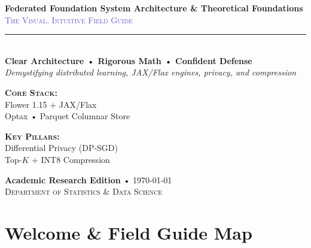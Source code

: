 \documentclass[11pt,a4paper,titlepage]{report}
\begin{document}
\begin{titlepage}
    \centering
    \vspace*{1.2cm}
    {\Huge \textbf{\textcolor{DeepNavy}{Federated Foundation System Architecture \& Theoretical Foundations}}}\\[0.5cm]
    {\Large \textsc{\textcolor{SlateBlue}{The Visual, Intuitive Field Guide}}}\\[1.2cm]

    \rule{0.85\textwidth}{1.5pt}\\[1.2cm]

    {\Large \textbf{\textcolor{Charcoal}{Clear Architecture • Rigorous Math • Confident Defense}}}\\[0.4cm]
    \textit{Demystifying distributed learning, JAX/Flax engines, privacy, and compression}\\[2.2cm]

    \begin{minipage}{0.48\textwidth}
        \begin{flushleft} \large
            \textsc{\textbf{Core Stack:}}\\
            Flower 1.15 + JAX/Flax\\
            Optax • Parquet Columnar Store
        \end{flushleft}
    \end{minipage}
    \hfill
    \begin{minipage}{0.48\textwidth}
        \begin{flushright} \large
            \textsc{\textbf{Key Pillars:}}\\
            Differential Privacy (DP-SGD)\\
            Top-$K$ + INT8 Compression
        \end{flushright}
    \end{minipage}

    \vfill
    {\large \textbf{Academic Research Edition} \quad • \quad \today}\\[0.4cm]
    \textsc{Department of Statistics \& Data Science}
\end{titlepage}

\tableofcontents
\newpage

\chapter*{Welcome \& Field Guide Map}
\end{document}
